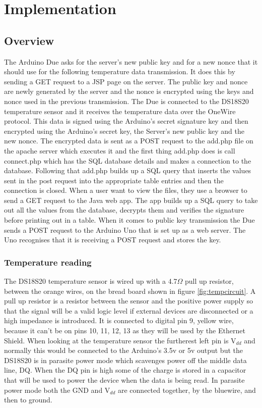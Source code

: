 
\chapter{Implementation}
\label{imple}

\section{Overview}

The Arduino Due asks for the server's new public key and for a new nonce that it should use for the following temperature data transmission. It does this by sending a GET request to a JSP page on the server. The public key and nonce are newly generated by the server and the nonce is encrypted using the keys and nonce used in the previous transmission. The Due is connected to the DS18S20 temperature sensor and it receives the temperature data over the OneWire protocol. This data is signed using the Arduino's secret signature key and then encrypted using the Arduino's secret key, the Server's new public key and the new nonce. The encrypted data is sent as a POST request to the add.php file on the apache server which executes it and the first thing add.php does is call connect.php which has the SQL database details and makes a connection to the database. Following that add.php builds up a SQL query that inserts the values sent in the post request into the appropriate table entries and then the connection is closed.
When a user want to view the files, they use a browser to send a GET request to the Java web app. The app builds up a SQL query to take out all the values from the database, decrypts them and verifies the signature before printing out in a table.
When it comes to public key transmission the Due sends a POST request to the Arduino Uno that is set up as a web server. The Uno recognises that it is receiving a POST request and stores the key.


\subsection{Temperature reading}

The DS18S20 temperature sensor is wired up with a 4.7$\Omega$ pull up resistor, between the orange wires, on the bread board shown in figure \ref{fig:tempcircuit}. A pull up resistor is a resistor between the sensor and the positive power supply so that the signal will be a valid logic level if external devices are disconnected or a high impedance is introduced. It is connected to digital pin 9, yellow wire, because it can't be on pins 10, 11, 12, 13 as they will be used by the Ethernet Shield. When looking at the temperature sensor the furtherest left pin is V$_{dd}$ and normally this would be connected to the Arduino's 3.5v or 5v output but the DS18S20 is in parasite power mode which scavenges power off the middle data line, DQ. When the DQ pin is high some of the charge is stored in a capacitor that will be used to power the device when the data is being read. In parasite power mode both the GND and V$_{dd}$ are connected together, by the bluewire, and then to ground.

